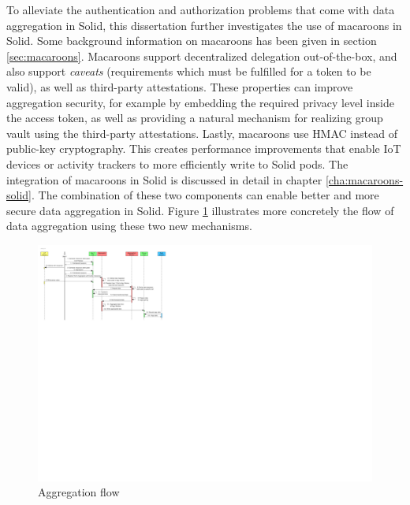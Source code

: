 To alleviate the authentication and authorization problems that come with data aggregation in Solid, this dissertation further investigates the use of macaroons in Solid. Some background information on macaroons has been given in section \ref{sec:macaroons}. Macaroons support decentralized delegation out-of-the-box, and also support \textit{caveats} (requirements which must be fulfilled for a token to be valid), as well as third-party attestations. These properties can improve aggregation security, for example by embedding the required privacy level inside the access token, as well as providing a natural mechanism for realizing group vault using the third-party attestations. Lastly, macaroons use \acrlong{HMAC} instead of public-key cryptography. This creates performance improvements that enable IoT devices or activity trackers to more efficiently write to Solid pods. The integration of macaroons in Solid is discussed in detail in chapter \ref{cha:macaroons-solid}. The combination of these two components can enable better and more secure data aggregation in Solid. Figure \ref{fig:aggregation-flow} illustrates more concretely the flow of data aggregation using these two new mechanisms.

\begin{figure}
    \centering
    \includegraphics[width=1.0\textwidth]{images/architecture/InteractionDiagram-Aggregation-flow.pdf}
    \caption{Aggregation flow}
    \label{fig:aggregation-flow}
\end{figure}

